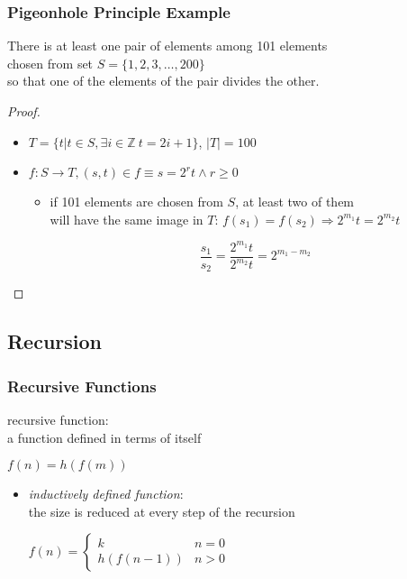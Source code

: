\documentclass[dvipsnames]{beamer}
\begin{document}
\begin{frame}
  \frametitle{Pigeonhole Principle Example}

  \begin{theorem}
    There is at least one pair of elements among 101 elements\\
    chosen from set $S = \{1,2,3,\dots,200\}$\\
    so that one of the elements of the pair divides the other.
  \end{theorem}

  \pause
  \begin{proof}
    \begin{itemize}
      \item $T=\{t | t \in S, \exists i \in \mathbb{Z}~t=2i+1\}$, $|T|=100$

      \pause
      \item $f: S \rightarrow T, (s, t) \in f \equiv s = 2^r t \wedge r \geq 0$
      \begin{itemize}
        \item if 101 elements are chosen from $S$, at least two of them\\
          will have the same image in $T$:
          $f(s_1)=f(s_2) \Rightarrow 2^{m_1} t = 2^{m_2} t$

        \pause
        \[
          \frac {s_1} {s_2} = \frac {2^{m_1} t} {2^{m_2} t} = 2^{m_1 - m_2}
        \]
      \end{itemize}
    \end{itemize}
  \end{proof}
\end{frame}

\subsection{Recursion}

\begin{frame}
  \frametitle{Recursive Functions}

  \begin{definition}
    \alert{recursive function}:\\
      a function defined in terms of itself

    \medskip
    $f(n) = h(f(m))$
  \end{definition}

  \begin{itemize}
    \item \emph{inductively defined function}:\\
      the size is reduced at every step of the recursion

    \medskip
    $f(n) = \left\{
      \begin{array}{ll}
        k         & n = 0\\
        h(f(n-1)) & n > 0
      \end{array}
    \right.$
  \end{itemize}
\end{frame}
\end{document}
